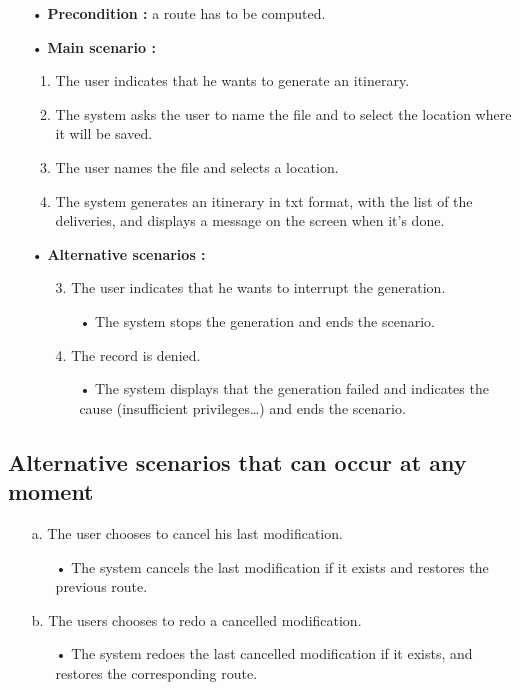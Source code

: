 \documentclass[paper=a4, fontsize=11pt]{report}
\numberwithin{equation}{section}		%
\numberwithin{figure}{section}		%
\numberwithin{table}{section}		%
\begin{document}
\begin{itemize}
  \item[•] \textbf{Precondition :} a route has to be computed.
  \item[•] \textbf{Main scenario :}
  \begin{enumerate}
    \item The user indicates that he wants to generate an itinerary.
    \item The system asks the user to name the file and to select the location where it will be saved.
    \item The user names the file and selects a location.
    \item The system generates an itinerary in txt format, with the list of the deliveries, and displays a message on the screen when it’s done.
  \end{enumerate}
  \item[•] \textbf{Alternative scenarios :}
  \begin{itemize}
    \item[3.] The user indicates that he wants to interrupt the generation.
    \begin{itemize}
      \item[•] The system stops the generation and ends the scenario.
    \end{itemize}
    \item[4.]  The record is denied.
    \begin{itemize}
      \item[•] The system displays that the generation failed and indicates the cause (insufficient privileges…) and ends the scenario.
    \end{itemize}
  \end{itemize}
\end{itemize}

\subsection{Alternative scenarios that can occur at any moment}
\label{subsec:alternative-scenarios-that-can-occur-at-any-moment}

\begin{itemize}
  \item[a.] The user chooses to cancel his last modification.
  \begin{itemize}
    \item[•] The system cancels the last modification if it exists and restores the previous route.
  \end{itemize}
  \item[b.] The users chooses to redo a cancelled modification.
  \begin{itemize}
    \item[•] The system redoes the last cancelled modification if it exists, and restores the corresponding route.
  \end{itemize}
\end{itemize}
\end{document}
